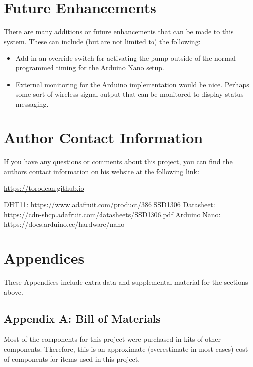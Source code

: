 \documentclass{article}
\begin{document}
\begin{multicols}{2}
		\section{Future Enhancements}
		There are many additions or future enhancements that can be made to this system. These can include (but are not limited to) the following:
		\begin{itemize}
			\item Add in an override switch for activating the pump outside of the normal programmed timing for the Arduino Nano setup.
			\item External monitoring for the Arduino implementation would be nice. Perhaps some sort of wireless signal output that can be monitored to display status messaging.
		\end{itemize}
		
		\section{Author Contact Information}
		
		If you have any questions or comments about this project, you can find the authors contact information on his website at the following link:
		
		\begin{mdframed}[backgroundcolor=gray!08, linewidth=1pt]
			\url{https://torodean.github.io}
		\end{mdframed}
		
	\end{multicols} %
	
	\begin{thebibliography}{X}
		 DHT11: https://www.adafruit.com/product/386
		 SSD1306 Datasheet: https://cdn-shop.adafruit.com/datasheets/SSD1306.pdf
		 Arduino Nano: https://docs.arduino.cc/hardware/nano
	\end{thebibliography}	
	
	\section{Appendices}
	These Appendices include extra data and supplemental material for the sections above.
	
	\subsection{Appendix A: Bill of Materials}
	Most of the components for this project were purchased in kits of other components. Therefore, this is an approximate (overestimate in most cases) cost of components for items used in this project. 
	
\end{document}
